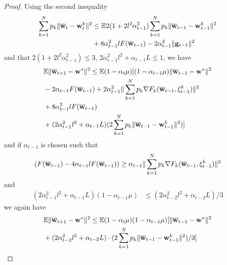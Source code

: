 \begin{proof}
	Using the second inequality
	\begin{align*}
	\sum_{k=1}^{N}p_{k}\|{\overline{\mathbf{w}}}_{t}-{\mathbf{w}}_{t}^{k}\|^{2} & \leq\mathbb{E}2(1+2l^{2}\alpha_{t-1}^{2})\sum_{k=1}^{N}p_{k}\|{\overline{\mathbf{w}}}_{t-1}-{\mathbf{w}}_{t-1}^{k}\|^{2}\\ &+8\alpha_{t-1}^{2}lF({\overline{\mathbf{w}}}_{t-1})-2\alpha_{t-1}^{2}\|{\mathbf{g}}_{t-1}\|^{2}
	\end{align*}
	and that $2(1+2l^{2}\alpha_{t-1}^{2})\leq3$, $2\alpha_{t-1}^{2}l^{2}+\alpha_{t-1}L\le1$,
	we have 
	\begin{align*}
	&\mathbb{E}\|{\overline{\mathbf{w}}}_{t+1}-{\mathbf{w}}^{\ast}\|^{2} \leq\mathbb{E}(1-\alpha_{t}\mu)[(1-\alpha_{t-1}\mu)\|{\overline{\mathbf{w}}}_{t-1}-{\mathbf{w}}^{\ast}\|^{2}\\
	& -2\alpha_{t-1}F({\overline{\mathbf{w}}}_{t-1})+2\alpha_{t-1}^{2}\|\sum_{k=1}^{N}p_{k}\nabla F_{k}({\overline{\mathbf{w}}}_{t-1},\xi_{t-1}^{k})\|^{2}\\
	& +8\alpha_{t-1}^{2}lF({\overline{\mathbf{w}}}_{t-1})\\
	& +(2\alpha_{t-1}^{2}l^{2}+\alpha_{t-1}L)(2\sum_{k=1}^{N}p_{k}\|{\overline{\mathbf{w}}}_{t-1}-{\mathbf{w}}_{t-1}^{k}\|^{2})]
	\end{align*}
	and if $\alpha_{t-1}$ is chosen such that 
	\begin{align*}
	(F({\overline{\mathbf{w}}}_{t-1})-4\alpha_{t-1}lF({\overline{\mathbf{w}}}_{t-1}))\geq \alpha_{t-1}\|\sum_{k=1}^{N}p_{k}\nabla F_{k}({\overline{\mathbf{w}}}_{t-1},\xi_{t-1}^{k})\|^{2}
	\end{align*}
	and
	\begin{align*} (2\alpha_{t-1}^{2}l^{2}+\alpha_{t-1}L)(1-\alpha_{t-1}\mu)
	&\leq(2\alpha_{t-2}^{2}l^{2}+\alpha_{t-2}L)/3
	\end{align*}
	we again have 
	\begin{align*}
	& \mathbb{E}\|{\overline{\mathbf{w}}}_{t+1}-{\mathbf{w}}^{\ast}\|^{2} \leq\mathbb{E}(1-\alpha_{t}\mu)(1-\alpha_{t-1}\mu)[\|{\overline{\mathbf{w}}}_{t-1}-{\mathbf{w}}^{\ast}\|^{2}\\
	& +(2\alpha_{t-2}^{2}l^{2}+\alpha_{t-2}L)\cdot(2\sum_{k=1}^{N}p_{k}\|{\overline{\mathbf{w}}}_{t-1}-{\mathbf{w}}_{t-1}^{k}\|^{2})/3]
	\end{align*}
	

\end{proof}
